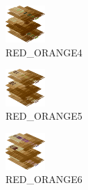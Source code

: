 \hspace{0.1cm}
\begin{minipage}[b]{0.15\linewidth}
\begin{figure}[H]                                                          
  \centering                                                             
  \begin{adjustbox}{width=1.5cm,center}                                   
  \includegraphics[width=1.5cm]{src/colorspace_colourflow/flows/colourflow_36-45.png}%
  \end{adjustbox}                                                        
\caption*{RED\_ORANGE4}                                           
\end{figure}                                                               
\end{minipage}
\hspace{0.1cm}
\begin{minipage}[b]{0.15\linewidth}
\begin{figure}[H]                                                          
  \centering                                                             
  \begin{adjustbox}{width=1.5cm,center}                                   
  \includegraphics[width=1.5cm]{src/colorspace_colourflow/flows/colourflow_37-45.png}%
  \end{adjustbox}                                                        
\caption*{RED\_ORANGE5}                                           
\end{figure}                                                               
\end{minipage}
\hspace{0.1cm}
\begin{minipage}[b]{0.15\linewidth}
\begin{figure}[H]                                                          
  \centering                                                             
  \begin{adjustbox}{width=1.5cm,center}                                   
  \includegraphics[width=1.5cm]{src/colorspace_colourflow/flows/colourflow_38-45.png}%
  \end{adjustbox}                                                        
\caption*{RED\_ORANGE6}                                           
\end{figure}                                                               
\end{minipage}
